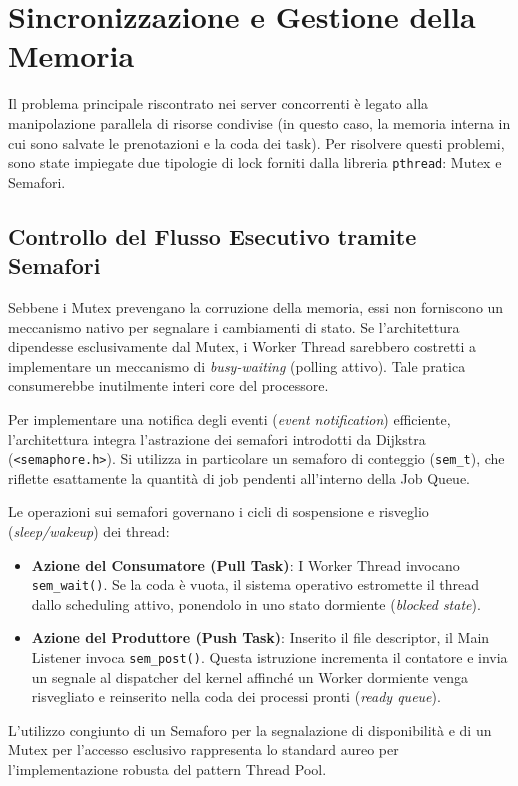\documentclass[a4paper,12pt]{article}
\begin{document}
\newpage
\section{Sincronizzazione e Gestione della Memoria}
Il problema principale riscontrato nei server concorrenti è legato alla manipolazione parallela di risorse condivise (in questo caso, la memoria interna in cui sono salvate le prenotazioni e la coda dei task). Per risolvere questi problemi, sono state impiegate due tipologie di lock forniti dalla libreria \texttt{pthread}: Mutex e Semafori.

\subsection{Controllo del Flusso Esecutivo tramite Semafori}
Sebbene i Mutex prevengano la corruzione della memoria, essi non forniscono un meccanismo nativo per segnalare i cambiamenti di stato. Se l'architettura dipendesse esclusivamente dal Mutex, i Worker Thread sarebbero costretti a implementare un meccanismo di \textit{busy-waiting} (polling attivo). Tale pratica consumerebbe inutilmente interi core del processore.

Per implementare una notifica degli eventi (\textit{event notification}) efficiente, l'architettura integra l'astrazione dei semafori introdotti da Dijkstra (\texttt{<semaphore.h>}). Si utilizza in particolare un semaforo di conteggio (\texttt{sem\_t}), che riflette esattamente la quantità di job pendenti all'interno della Job Queue.

Le operazioni sui semafori governano i cicli di sospensione e risveglio (\textit{sleep/wakeup}) dei thread:
\begin{itemize}
    \item \textbf{Azione del Consumatore (Pull Task)}: I Worker Thread invocano \texttt{sem\_wait()}. Se la coda è vuota, il sistema operativo estromette il thread dallo scheduling attivo, ponendolo in uno stato dormiente (\textit{blocked state}).
    \item \textbf{Azione del Produttore (Push Task)}: Inserito il file descriptor, il Main Listener invoca \texttt{sem\_post()}. Questa istruzione incrementa il contatore e invia un segnale al dispatcher del kernel affinché un Worker dormiente venga risvegliato e reinserito nella coda dei processi pronti (\textit{ready queue}).
\end{itemize}

L'utilizzo congiunto di un Semaforo per la segnalazione di disponibilità e di un Mutex per l'accesso esclusivo rappresenta lo standard aureo per l'implementazione robusta del pattern Thread Pool.
\end{document}
